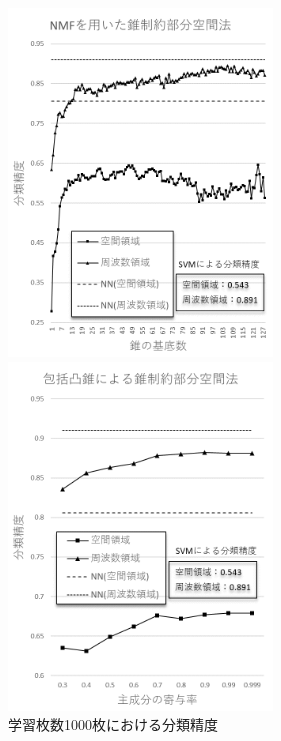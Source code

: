 \begin{figure}[htbp]
	\begin{minipage}{0.5\hsize}
		\begin{center}
			\includegraphics[width=70mm]{result/1000-nmf.png}
		\end{center}
	\end{minipage}
	\begin{minipage}{0.5\hsize}
		\begin{center}
			\includegraphics[width=70mm]{result/1000-comp.png}
		\end{center}
	\end{minipage}
	\caption{学習枚数1000枚における分類精度}
	\label{result_last}
\end{figure}

